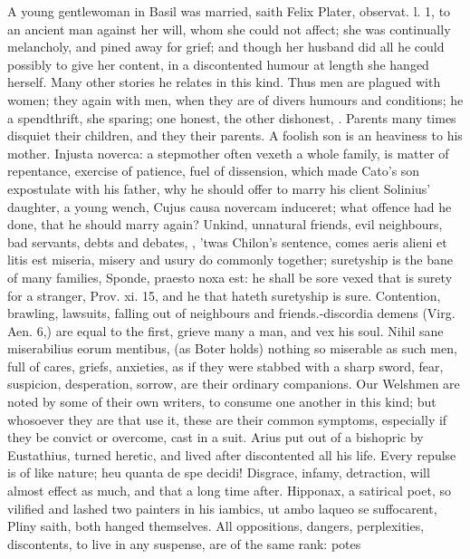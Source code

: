{A young gentlewoman in Basil was married, saith Felix Plater,
observat. l. 1, to an ancient man against her will, whom she could not
affect; she was continually melancholy, and pined away for grief; and
though her husband did all he could possibly to give her content, in a
discontented humour at length she hanged herself. Many other stories he
relates in this kind. Thus men are plagued with women; they again with
men, when they are of divers humours and conditions; he a spendthrift,
she sparing; one honest, the other dishonest, \etc{}. Parents many times
disquiet their children, and they their parents. A foolish son is
an heaviness to his mother. Injusta noverca: a stepmother often vexeth
a whole family, is matter of repentance, exercise of patience, fuel of
dissension, which made Cato's son expostulate with his father, why he
should offer to marry his client Solinius' daughter, a young wench,
Cujus causa novercam induceret; what offence had he done, that he
should marry again?
Unkind, unnatural friends, evil neighbours, bad servants, debts and
debates, \etc{}, 'twas Chilon's sentence, comes aeris alieni et litis est
miseria, misery and usury do commonly together; suretyship is the bane
of many families, Sponde, praesto noxa est: he shall be sore vexed that
is surety for a stranger, Prov. xi. 15, and he that hateth suretyship
is sure. Contention, brawling, lawsuits, falling out of neighbours and
friends.-discordia demens (Virg. Aen. 6,) are equal to the first,
grieve many a man, and vex his soul. Nihil sane miserabilius eorum
mentibus, (as Boter holds) nothing so miserable as such men, full
of cares, griefs, anxieties, as if they were stabbed with a sharp
sword, fear, suspicion, desperation, sorrow, are their ordinary
companions. Our Welshmen are noted by some of their own writers,
to consume one another in this kind; but whosoever they are that use
it, these are their common symptoms, especially if they be convict or
overcome, cast in a suit. Arius put out of a bishopric by
Eustathius, turned heretic, and lived after discontented all his life.
Every repulse is of like nature; heu quanta de spe decidi!
Disgrace, infamy, detraction, will almost effect as much, and that a
long time after. Hipponax, a satirical poet, so vilified and lashed two
painters in his iambics, ut ambo laqueo se suffocarent, Pliny
saith, both hanged themselves. All oppositions, dangers, perplexities,
discontents, to live in any suspense, are of the same rank: potes
}
